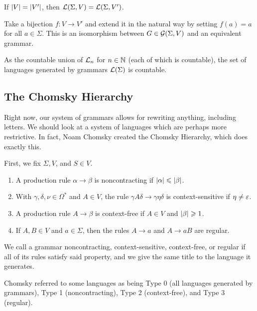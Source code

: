 \documentclass{article}
\begin{document}
\begin{proposition}
	\label{only-size-of-v-matters}
	If $\left\lvert V \right\rvert = \left\lvert V' \right\rvert$, then $\mathcal{L}(\Sigma, V) = \mathcal{L}(\Sigma, V')$.
\end{proposition}

\begin{prf}
	Take a bijection $f: V \to V'$ and extend it in the natural way by setting $f(a) = a$ for all $a \in \Sigma$. This is an isomorphism between $G \in \mathcal{G}(\Sigma, V)$ and an equivalent grammar.
\end{prf}

\begin{corollary}
	As the countable union of $\mathcal{L}_n$ for $n \in \mathbb{N}$ (each of which is countable), the set of languages generated by grammars $\mathcal{L}(\Sigma)$ is countable.
\end{corollary}

\subsection{The Chomsky Hierarchy}

Right now, our system of grammars allows for rewriting anything, including letters. We should look at a system of languages which are perhaps more restrictive. In fact, Noam Chomsky created the Chomsky Hierarchy, which does exactly this.

\begin{definition}
	\label{noncontracting-contextuality-regularity}
	First, we fix $\Sigma, V$, and $S \in V$.
	\begin{enumerate}
		\item A production rule $\alpha \to \beta$ is noncontracting if $\left\lvert \alpha \right\rvert \leqslant \left\lvert \beta \right\rvert$.
		\item With $\gamma, \delta, \nu \in \Omega^*$ and $A \in V$, the rule $\gamma A \delta \to \gamma \eta \delta$ is context-sensitive if $\eta \neq \varepsilon$.
		\item A production rule $A \to \beta$ is context-free if $A \in V$ and $\left\lvert \beta \right\rvert \geqslant 1$.
		\item If $A, B \in V$ and $a \in \Sigma$, then the rules $A \to a$ and $A \to aB$ are regular.
	\end{enumerate}
	We call a grammar noncontracting, context-sensitive, context-free, or regular if all of its rules satisfy said property, and we give the same title to the language it generates.
		
	Chomsky referred to some languages as being Type 0 (all languages generated by grammars), Type 1 (noncontracting), Type 2 (context-free), and Type 3 (regular).
\end{definition}
\end{document}
